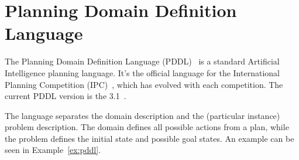 \documentclass{report}
\theoremstyle{plain}
\begin{document}
\section{Planning Domain Definition Language}
The Planning Domain Definition Language (PDDL)~\cite{pddl1.2,pddl2.1,pddl2.2,pddl3.0,pddl3.1,pddl3.1-corrected} is a standard Artificial Intelligence planning language. It's the official language for the International Planning Competition (IPC)~\cite{icaps}, which has evolved with each competition. The current PDDL version is the 3.1~\cite{pddl3.1-corrected}.

The language separates the domain description and the (particular instance) problem description. The domain defines all possible actions from a plan, while the problem defines the initial state and possible goal states. An example can be seen in Example~\ref{ex:pddl}.

\vspace{1\baselineskip}
\end{document}
